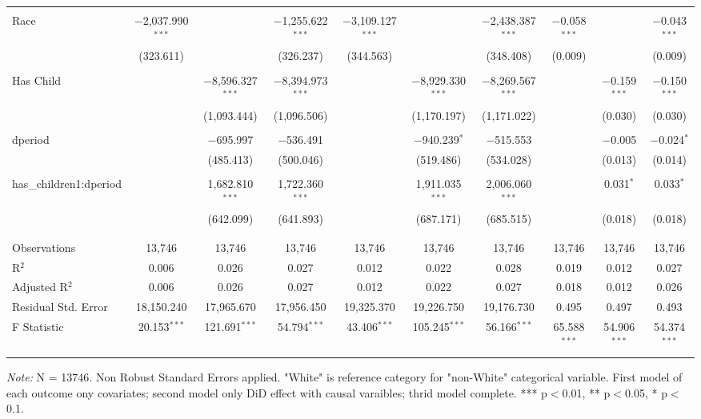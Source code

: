 \documentclass[a4paper]{article}
\begin{document}
\begin{landscape}
\begin{table}[!htbp]
\begin{adjustwidth}{1.25cm}{-0cm}
\begin{threeparttable}
\begin{tabular}{@{\extracolsep{-2pt}}lccccccccc}
  & & & & & & & & & \\ 
 Race & $-$2,037.990$^{***}$ &  & $-$1,255.622$^{***}$ & $-$3,109.127$^{***}$ &  & $-$2,438.387$^{***}$ & $-$0.058$^{***}$ &  & $-$0.043$^{***}$ \\ 
  & (323.611) &  & (326.237) & (344.563) &  & (348.408) & (0.009) &  & (0.009) \\ 
  & & & & & & & & & \\ 
 Has Child &  & $-$8,596.327$^{***}$ & $-$8,394.973$^{***}$ &  & $-$8,929.330$^{***}$ & $-$8,269.567$^{***}$ &  & $-$0.159$^{***}$ & $-$0.150$^{***}$ \\ 
  &  & (1,093.444) & (1,096.506) &  & (1,170.197) & (1,171.022) &  & (0.030) & (0.030) \\ 
  & & & & & & & & & \\ 
 dperiod &  & $-$695.997 & $-$536.491 &  & $-$940.239$^{*}$ & $-$515.553 &  & $-$0.005 & $-$0.024$^{*}$ \\ 
  &  & (485.413) & (500.046) &  & (519.486) & (534.028) &  & (0.013) & (0.014) \\ 
  & & & & & & & & & \\ 
 has\_children1:dperiod &  & 1,682.810$^{***}$ & 1,722.360$^{***}$ &  & 1,911.035$^{***}$ & 2,006.060$^{***}$ &  & 0.031$^{*}$ & 0.033$^{*}$ \\ 
  &  & (642.099) & (641.893) &  & (687.171) & (685.515) &  & (0.018) & (0.018) \\ 
  & & & & & & & & & \\ 
\hline \\[-1.8ex] 
Observations & 13,746 & 13,746 & 13,746 & 13,746 & 13,746 & 13,746 & 13,746 & 13,746 & 13,746 \\ 
R$^{2}$ & 0.006 & 0.026 & 0.027 & 0.012 & 0.022 & 0.028 & 0.019 & 0.012 & 0.027 \\ 
Adjusted R$^{2}$ & 0.006 & 0.026 & 0.027 & 0.012 & 0.022 & 0.027 & 0.018 & 0.012 & 0.026 \\ 
Residual Std. Error & 18,150.240  & 17,965.670  & 17,956.450 & 19,325.370 & 19,226.750  & 19,176.730  & 0.495  & 0.497  & 0.493  \\ 
F Statistic & 20.153$^{***}$  & 121.691$^{***}$  & 54.794$^{***}$ & 43.406$^{***}$  & 105.245$^{***}$  & 56.166$^{***}$ & 65.588$^{***}$  & 54.906$^{***}$  & 54.374$^{***}$  \\
\hline 
\hline \\[-3.5ex] 
\end{tabular} 
\begin{tablenotes}
      \small
      \item\textit{Note:} N = 13746. Non Robust Standard Errors applied. "White" is reference category for "non-White" categorical variable. First model of each outcome ony covariates; second model only DiD effect with causal varaibles; thrid model complete. *** p$<$0.01, ** p$<$0.05, * p$<$0.1.
    \end{tablenotes}
\end{threeparttable}
\end{adjustwidth}
%
\end{table}


\end{landscape}
\end{document}
